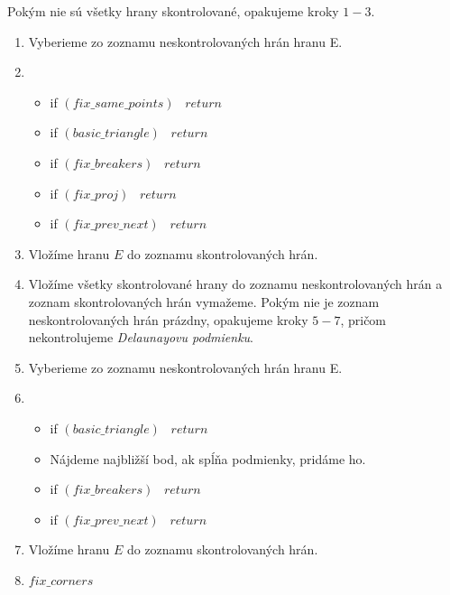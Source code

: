 Pokým nie sú všetky hrany skontrolované, opakujeme kroky $1-3$.
\begin{enumerate}
    \item{
        Vyberieme zo zoznamu neskontrolovaných hrán hranu E.
    }
    \item{
        \begin{itemize}
            \item{
                if $(fix\_same\_points)$ \, $return$
            }
            \item{
                if $(basic\_triangle)$ \, $return$
            }
            \item{
                if $(fix\_breakers)$ \, $return$
            }
            \item{
                if $(fix\_proj)$ \, $return$
            }
            \item{
                if $(fix\_prev\_next)$ \, $return$
            }
        \end{itemize}
    }
    \item{
        Vložíme hranu $E$ do zoznamu skontrolovaných hrán.
    }
    \item{
        Vložíme všetky skontrolované hrany do zoznamu neskontrolovaných hrán a 
        zoznam skontrolovaných hrán vymažeme. Pokým nie je zoznam neskontrolovaných hrán prázdny,
        opakujeme kroky $5-7$, pričom nekontrolujeme \textit{Delaunayovu podmienku}.
    }
    \item{
        Vyberieme zo zoznamu neskontrolovaných hrán hranu E.
    }
    \item{
        \begin{itemize}
            \item{
                if $(basic\_triangle)$ \, $return$
            }
            \item{
                Nájdeme najbližší bod, ak spĺňa podmienky, pridáme ho.
            }
            \item{
                if $(fix\_breakers)$ \, $return$
            }
            \item{
                if $(fix\_prev\_next)$ \, $return$
            }
        \end{itemize}
    }
    \item{
        Vložíme hranu $E$ do zoznamu skontrolovaných hrán.
    }
    \item{
        $fix\_corners$
    }
\end{enumerate}

